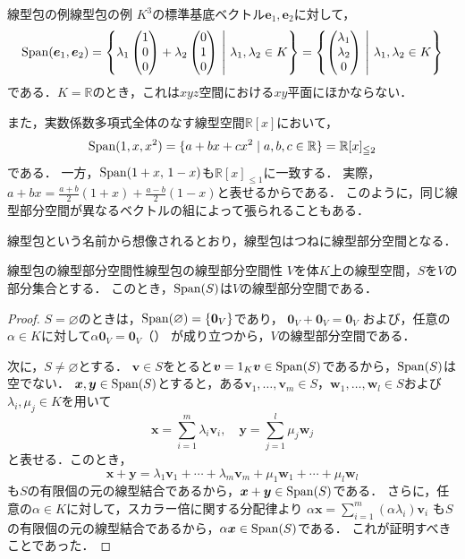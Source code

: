 \begin{example}{線型包の例}{線型包の例}
  $K^3$の標準基底ベクトル$\bm{e}_1,\bm{e}_2$に対して，
  \[
    \operatorname{Span}(\bm{e}_1, \bm{e}_2)
    = \left\{ \lambda_1 \begin{pmatrix} 1 \\ 0 \\ 0 \end{pmatrix} + \lambda_2 \begin{pmatrix} 0 \\ 1 \\ 0 \end{pmatrix} ~\middle|~ \lambda_1, \lambda_2 \in K \right\}
    = \left\{ \begin{pmatrix} \lambda_1 \\ \lambda_2 \\ 0 \end{pmatrix} ~\middle|~ \lambda_1, \lambda_2 \in K \right\}
  \]
  である．$K = \mathbb{R}$のとき，これは$xyz$空間における$xy$平面にほかならない．

  また，実数係数多項式全体のなす線型空間$\mathbb{R}[x]$において，
  \[
    \operatorname{Span}(1, x, x^2)
    = \{ a + bx + cx^2 \mid a, b, c \in \mathbb{R} \}
    = \mathbb{R}[x]_{\leqq 2}
  \]
  である．
  一方，$\operatorname{Span}(1+x,\,1-x)$も$\mathbb{R}[x]_{\le 1}$に一致する．
  実際，$a+bx=\frac{a+b}{2}(1+x)+\frac{a-b}{2}(1-x)$と表せるからである．
  このように，同じ線型部分空間が異なるベクトルの組によって張られることもある．
\end{example}

線型包という名前から想像されるとおり，線型包はつねに線型部分空間となる．

\begin{prop}{線型包の線型部分空間性}{線型包の線型部分空間性}
  $V$を体$K$上の線型空間，$S$を$V$の部分集合とする．
  このとき，$\operatorname{Span}(S)$は$V$の線型部分空間である．
\end{prop}

\begin{tleftbar}
\begin{proof}
  $S = \varnothing$のときは，$\operatorname{Span}(\varnothing) = \{\bm{0}_V\}$であり，
  $\bm{0}_V + \bm{0}_V = \bm{0}_V$
  および，任意の$\alpha \in K$に対して$\alpha \bm{0}_V = \bm{0}_V$（）
  が成り立つから，$V$の線型部分空間である．

  次に，$S \neq \varnothing$とする．
  $\bm{v} \in S$をとると$\bm{v} = 1_K \bm{v} \in \operatorname{Span}(S)$であるから，$\operatorname{Span}(S)$は空でない．
  $\bm{x}, \bm{y} \in \operatorname{Span}(S)$とすると，ある$\bm{v}_1, \dots, \bm{v}_m \in S$，$\bm{w}_1, \dots, \bm{w}_l \in S$および$\lambda_i, \mu_j \in K$を用いて
  \[
    \bm{x} = \sum_{i=1}^{m} \lambda_i \bm{v}_i, \quad
    \bm{y} = \sum_{j=1}^{l} \mu_j \bm{w}_j
  \]
  と表せる．このとき，
  \[
    \bm{x} + \bm{y}
    = \lambda_1 \bm{v}_1 + \cdots + \lambda_m \bm{v}_m + \mu_1 \bm{w}_1 + \cdots + \mu_l \bm{w}_l
  \]
  も$S$の有限個の元の線型結合であるから，$\bm{x} + \bm{y} \in \operatorname{Span}(S)$である．
  さらに，任意の$\alpha \in K$に対して，スカラー倍に関する分配律より
  $\alpha\bm{x} = \sum_{i=1}^{m} (\alpha\lambda_i) \bm{v}_i$
  も$S$の有限個の元の線型結合であるから，$\alpha\bm{x} \in \operatorname{Span}(S)$である．
  これが証明すべきことであった．
\end{proof}
\end{tleftbar}

